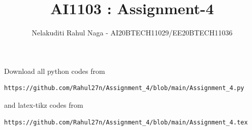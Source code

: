 \documentclass[journal,12pt,twocolumn]{IEEEtran}
\DeclareMathOperator*{\Res}{Res}
\begin{document}
\newcommand{\BEQA}{\begin{eqnarray}}
\newcommand{\EEQA}{\end{eqnarray}}
\newcommand{\define}{\stackrel{\triangle}{=}}

\raggedbottom
\setlength{\parindent}{0pt}
\providecommand{\mbf}{\mathbf}
\providecommand{\pr}[1]{\ensuremath{\Pr\left(#1\right)}}
\providecommand{\qfunc}[1]{\ensuremath{Q\left(#1\right)}}
\providecommand{\sbrak}[1]{\ensuremath{{}\left[#1\right]}}
\providecommand{\lsbrak}[1]{\ensuremath{{}\left[#1\right.}}
\providecommand{\rsbrak}[1]{\ensuremath{{}\left.#1\right]}}
\providecommand{\brak}[1]{\ensuremath{\left(#1\right)}}
\providecommand{\lbrak}[1]{\ensuremath{\left(#1\right.}}
\providecommand{\rbrak}[1]{\ensuremath{\left.#1\right)}}
\providecommand{\cbrak}[1]{\ensuremath{\left\{#1\right\}}}
\providecommand{\lcbrak}[1]{\ensuremath{\left\{#1\right.}}
\providecommand{\rcbrak}[1]{\ensuremath{\left.#1\right\}}}
\theoremstyle{remark}
\newtheorem{rem}{Remark}
\newcommand{\sgn}{\mathop{\mathrm{sgn}}}
\providecommand{\abs}[1]{\vert#1\vert}
\providecommand{\res}[1]{\Res\displaylimits_{#1}} 
\providecommand{\norm}[1]{\lVert#1\rVert}
\providecommand{\mtx}[1]{\mathbf{#1}}
\providecommand{\mean}[1]{E[ #1 ]}
\providecommand{\fourier}{\overset{\mathcal{F}}{ \rightleftharpoons}}
\providecommand{\system}{\overset{\mathcal{H}}{ \longleftrightarrow}}
\newcommand{\solution}{\noindent \textbf{Solution: }}
\newcommand{\cosec}{\,\text{cosec}\,}
\providecommand{\dec}[2]{\ensuremath{\overset{#1}{\underset{#2}{\gtrless}}}}
\newcommand{\myvec}[1]{\ensuremath{\begin{pmatrix}#1\end{pmatrix}}}
\newcommand{\mydet}[1]{\ensuremath{\begin{vmatrix}#1\end{vmatrix}}}
\makeatletter
{}
\makeatother
\let\StandardTheFigure\thefigure
\let\vec\mathbf
\renewcommand{\thefigure}{\theproblem}
\def\putbox#1#2#3{\makebox[0in][l]{\makebox[#1][l]{}\raisebox{\baselineskip}[0in][0in]{\raisebox{#2}[0in][0in]{#3}}}}
     \def\rightbox#1{\makebox[0in][r]{#1}}
     \def\centbox#1{\makebox[0in]{#1}}
     \def\topbox#1{\raisebox{-\baselineskip}[0in][0in]{#1}}
     \def\midbox#1{\raisebox{-0.5\baselineskip}[0in][0in]{#1}}
\vspace{3cm}
\title{AI1103 : Assignment-4}
\author{Nelakuditi Rahul Naga - AI20BTECH11029/EE20BTECH11036}
\maketitle
\newpage
\bigskip
\renewcommand{\thefigure}{\theenumi}
\renewcommand{\thetable}{\theenumi}
Download all python codes from 
\begin{lstlisting}
https://github.com/Rahul27n/Assignment_4/blob/main/Assignment_4.py
\end{lstlisting}
%
and latex-tikz codes from 
%
\begin{lstlisting}
https://github.com/Rahul27n/Assignment_4/blob/main/Assignment_4.tex
\end{lstlisting}
\end{document}
